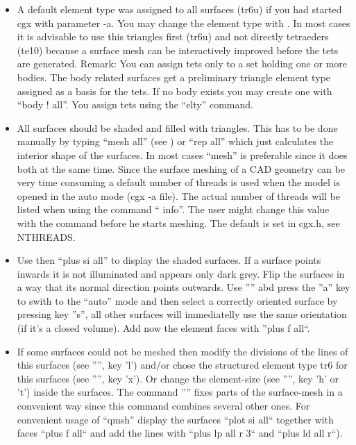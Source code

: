 \documentclass{article}
\begin{document}
\begin{appendix}
\begin{itemize}
\item A default element type was assigned to all surfaces (tr6u) if you had started cgx with parameter -a. You may change the element type with . In most cases it is advisable to use this triangles first (tr6u) and not directly tetraeders (te10) because a surface mesh can be interactively improved before the tets are generated. Remark: You can assign tets only to a set holding one or more bodies. The body related surfaces get a preliminary triangle element type assigned as a basis for the tets. If no body exists you may create one with ``body ! all''. You assign tets using the ``elty'' command.

\item All surfaces should be shaded and filled with triangles. This has to be done manually by typing ``mesh all'' (see ) or ``rep all'' which just calculates the interior shape of the surfaces. In most cases ``mesh'' is preferable since it does both at the same time. Since the surface meshing of a CAD geometry can be very time consuming a default number of threads is used when the model is opened in the auto mode (cgx -a file). The actual number of threads will be listed when using the command `` info''. The user might change this value with the command  before he starts meshing. The default is set in cgx.h, see NTHREADS.

\item Use then ``plus si all'' to display the shaded surfaces. If a surface points inwards it is not illuminated and appears only dark grey. Flip the surfaces in a way that its normal direction points outwards. Use '''' abd press the ''a'' key to swith to the ``auto'' mode and then select a correctly oriented surface by pressing key ''s'', all other surfaces will immediatelly use the same orientation (if it's a closed volume). Add now the element faces with ''plus f all``.

\item If some surfaces could not be meshed then modify the divisions of the lines of this surfaces (see '''', key 'l') and/or chose the structured element type tr6 for this surfaces (see '''', key 'x'). Or change the element-size (see '''', key 'h' or 't') inside the surfaces. The command '''' fixes parts of the surface-mesh in a convenient way since this command combines several other ones. For convenient usage of ``qmsh'' display the surfaces ``plot si all`` together with faces ``plus f all`` and add the lines with ``plus lp all r 3`` and ``plus ld all r``).


\end{itemize}
\end{appendix}
\end{document}
